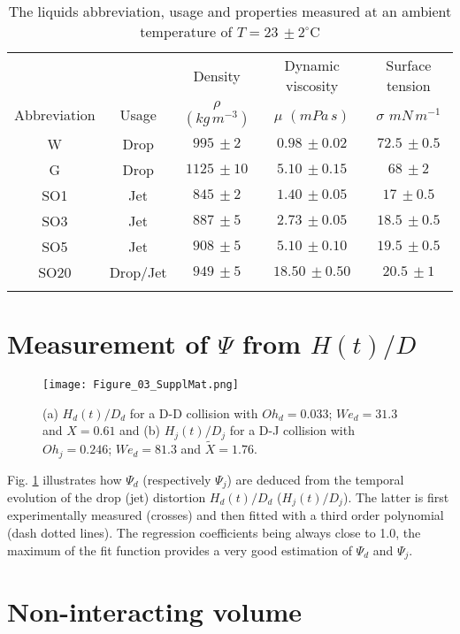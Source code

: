 \documentclass{article}
\begin{document}
\begin{table}
\caption{\label{tab01} The liquids abbreviation, usage and properties measured at an ambient temperature of $T=23\,\pm 2^\circ$C }
\centering
\begin{tabular}{ccccc}
\hline
\addlinespace[0.2cm]
 &  & Density & Dynamic viscosity & Surface tension \\
  Abbreviation & Usage & $\rho$ $(kg\,m^{-3})$ & $\mu$ $(mPa\,s)$& $\sigma$ $mN\,m^{-1}$ \\
  \addlinespace[0.2cm]
\hline 
\addlinespace[0.2cm]
W & Drop & $995\,\pm 2$ & $0.98\,\pm 0.02$ & $72.5\,\pm 0.5$  \\
G & Drop & $1125\,\pm 10$ & $5.10\,\pm 0.15$ & $68\,\pm 2$  \\
SO1 & Jet & $845\,\pm 2$ & $1.40\,\pm 0.05$ & $17\,\pm 0.5$  \\
SO3 & Jet & $887\,\pm 5$ & $2.73\,\pm 0.05$ & $18.5\,\pm 0.5$  \\
SO5 & Jet & $908\,\pm 5$ & $5.10\,\pm 0.10$ & $19.5\,\pm 0.5$  \\
SO20 & Drop/Jet & $949\,\pm 5$ & $18.50\,\pm 0.50$ & $20.5\,\pm 1$  \\
\addlinespace[0.2cm]
\hline
\end{tabular}
\end{table}

{\section{Measurement of $\Psi$ from $H(t)/D$}} \label{appC}
\FloatBarrier
\begin{figure}
\centering
\texttt{[image: Figure\_03\_SupplMat.png]}
\caption{\label{app_fig03} {(a) $H_d(t)/D_d$ for a D-D collision with $Oh_d=0.033$; $We_d=31.3$ and $X=0.61$ and (b) $H_j(t)/D_j$ for a D-J collision with  $Oh_j=0.246$; $We_d=81.3$ and $\tilde{X}=1.76$. }}
\end{figure}

{Fig. \ref{app_fig03} illustrates how $\Psi_d$ (respectively $\Psi_j$) are deduced from the temporal evolution of the drop (jet) distortion  $H_d(t)/D_d$ ($H_j(t)/D_j$). The latter is first experimentally measured (crosses) and then fitted  with a third order polynomial (dash dotted lines).   The regression coefficients  being always close to 1.0, the maximum of the fit function provides a very good estimation of  $\Psi_d$ and $\Psi_j$. }

\section{Non-interacting volume} \label{appD}
\end{document}

